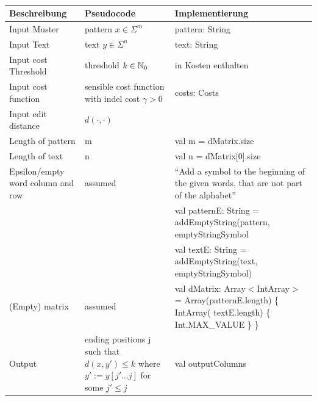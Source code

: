 \begin{erg}
    $\ $
    \begin{mytable}
        \scriptsize
        \begin{tabular}{|p{5cm}|p{5cm}|p{5cm}|}
            \hline
            \textbf{Beschreibung}            & \textbf{Pseudocode}      & \textbf{Implementierung}                                         \\
            \hline \hline
            Input Muster                     & pattern $x \in \Sigma^m$ & pattern: String                                                  \\
            Input Text & text $y \in \Sigma^n$ &
            text: String \\
            Input cost Threshold & threshold $k \in \mathbb{N}_0$ & in
            Kosten enthalten \\
            Input cost function & sensible cost function with indel cost $\gamma > 0$ &
            costs: Costs \\
            Input edit distance              & $d(\cdot, \cdot)$        &                                                                  \\
            \hline \hline
            Length of pattern                & m                        & val m = dMatrix.size                                             \\
            Length of text                   & n                        & val n = dMatrix[0].size                                          \\
            Epsilon/empty word column and row & assumed & ``Add a symbol to the beginning of the given words, that
            are not part of the alphabet'' \\
            &                          & val patternE: String = addEmptyString(pattern, emptyStringSymbol \\
            &                          & val textE: String = addEmptyString(text, emptyStringSymbol) \\
            (Empty) matrix & assumed & val dMatrix: Array$<$IntArray$>$ = Array(patternE.length) \{ IntArray(
            textE.length) \{ Int.MAX\_VALUE \} \} \\
            \hline \hline
            Output & ending positions j such that $d(x, y' ) \leq k$ where $y' := y[j' . . . j]$ for some $j' \leq j$
            & val outputColumns
            \\
            \hline \hline

\end{tabular}
\end{mytable}
\end{erg}
